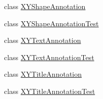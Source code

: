 \begin{DoxyCompactItemize}
class \mbox{\hyperlink{classorg_1_1jfree_1_1chart_1_1annotations_1_1_x_y_shape_annotation}{X\+Y\+Shape\+Annotation}}
\item 
class \mbox{\hyperlink{classorg_1_1jfree_1_1chart_1_1annotations_1_1_x_y_shape_annotation_test}{X\+Y\+Shape\+Annotation\+Test}}
\item 
class \mbox{\hyperlink{classorg_1_1jfree_1_1chart_1_1annotations_1_1_x_y_text_annotation}{X\+Y\+Text\+Annotation}}
\item 
class \mbox{\hyperlink{classorg_1_1jfree_1_1chart_1_1annotations_1_1_x_y_text_annotation_test}{X\+Y\+Text\+Annotation\+Test}}
\item 
class \mbox{\hyperlink{classorg_1_1jfree_1_1chart_1_1annotations_1_1_x_y_title_annotation}{X\+Y\+Title\+Annotation}}
\item 
class \mbox{\hyperlink{classorg_1_1jfree_1_1chart_1_1annotations_1_1_x_y_title_annotation_test}{X\+Y\+Title\+Annotation\+Test}}
\end{DoxyCompactItemize}
